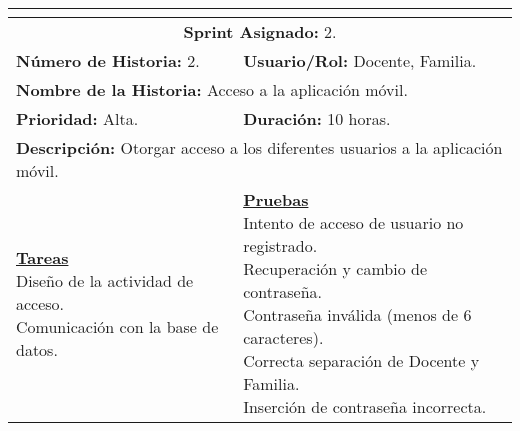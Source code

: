 
	\begin{tabular}{|l|l|}
		\hline
		\multicolumn{2}{|c|}{\cellcolor[HTML]{343434}{\color[HTML]{FFFFFF} \textbf{Historia de Usuario}}} \\
		\hline
		\multicolumn{2}{|c|}{\textbf{Sprint Asignado:} 2.} \\
		\hline
		\textbf{Número de Historia:} 2. & \textbf{Usuario/Rol:} Docente, Familia.\\
		\hline
		\multicolumn{2}{|l|}{\textbf{Nombre de la Historia:} Acceso a la aplicación móvil.} \\
		\hline
		\textbf{Prioridad:} Alta. & \textbf{Duración:} 10 horas.\\
		\hline
		\multicolumn{2}{|l|}{\textbf{Descripción:} Otorgar acceso a los diferentes usuarios a la aplicación móvil.} \\
		\hline
		\specialcell{\underline{\textbf{Tareas}} \\ Diseño de la actividad de acceso. \\ Comunicación con la base de datos.} & \specialcell{\underline{\textbf{Pruebas}} \\ Intento de acceso de usuario no registrado. \\ Recuperación y cambio de contraseña. \\ Contraseña inválida (menos de 6 caracteres). \\ Correcta separación de Docente y Familia. \\ Inserción de contraseña incorrecta.} \\
		\hline
	\end{tabular}


